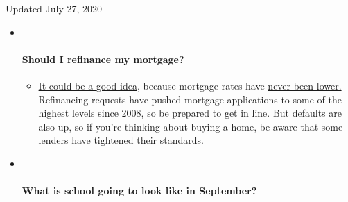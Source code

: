 Updated July 27, 2020

\begin{itemize}
\item ~
  \hypertarget{should-i-refinance-my-mortgage}{%
  \paragraph{Should I refinance my
  mortgage?}\label{should-i-refinance-my-mortgage}}

  \begin{itemize}
  \tightlist
  \item
    \href{https://www.nytimes.com/article/coronavirus-money-unemployment.html?action=click\&pgtype=Article\&state=default\&region=MAIN_CONTENT_3\&context=storylines_faq}{It
    could be a good idea,} because mortgage rates have
    \href{https://www.nytimes.com/2020/07/16/business/mortgage-rates-below-3-percent.html?action=click\&pgtype=Article\&state=default\&region=MAIN_CONTENT_3\&context=storylines_faq}{never
    been lower.} Refinancing requests have pushed mortgage applications
    to some of the highest levels since 2008, so be prepared to get in
    line. But defaults are also up, so if you're thinking about buying a
    home, be aware that some lenders have tightened their standards.
  \end{itemize}
\item ~
  \hypertarget{what-is-school-going-to-look-like-in-september}{%
  \paragraph{What is school going to look like in
  September?}\label{what-is-school-going-to-look-like-in-september}}


\end{itemize}

